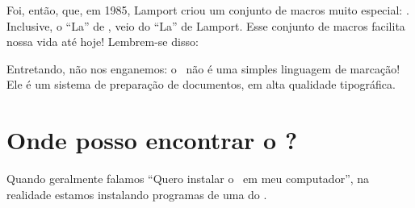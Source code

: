 Foi, então, que, em 1985, Lamport criou um conjunto de macros muito especial: \LaTeXX. 
Inclusive, o ``{\grega La}'' de \LaTeXX, veio do ``La'' de Lamport.
Esse conjunto de macros facilita nossa vida até hoje!
Lembrem-se disso: 



Entretando, não nos enganemos: o \LaTeXX\ não é uma simples linguagem de 
marcação! 
Ele é um sistema de preparação de documentos, em alta qualidade tipográfica.


\section{Onde posso encontrar o \LaTeXX?} 
\label{sec:encontrar}

Quando geralmente falamos ``Quero instalar o \LaTeXX\ em meu computador'', na 
realidade estamos instalando programas de uma  do \LaTeXX. 


